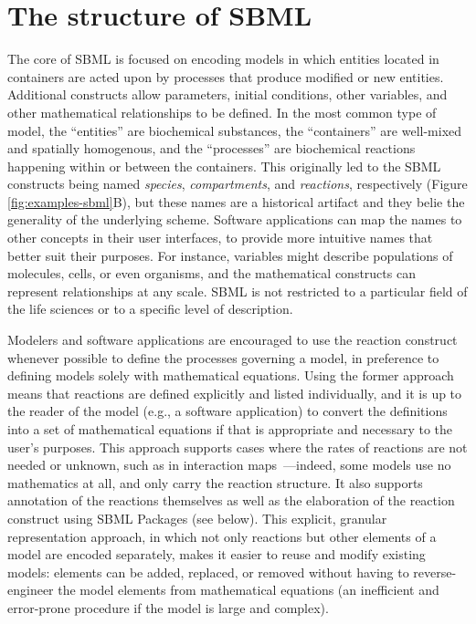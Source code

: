 \documentclass[]{draft-sbml-paper}
\begin{document}
\clearpage
\newpage

\section*{The structure of SBML}
\label{sec:sbml}

The core of SBML is focused on encoding models in which entities located in containers are acted upon by processes that produce modified or new entities.  Additional constructs allow parameters, initial conditions, other variables, and other mathematical relationships to be defined.  In the most common type of model, the ``entities'' are biochemical substances, the ``containers'' are well-mixed and spatially homogenous, and the ``processes'' are biochemical reactions happening within or between the containers.  This originally led to the SBML constructs being named \emph{species}, \emph{compartments}, and \emph{reactions}, respectively (Figure \ref{fig:examples-sbml}B), but these names are a historical artifact and they belie the generality of the underlying scheme.  Software applications can map the names to other concepts in their user interfaces, to provide more intuitive names that better suit their purposes.  For instance, variables might describe populations of molecules, cells, or even organisms, and the mathematical constructs can represent relationships at any scale.  SBML is not restricted to a particular field of the life sciences or to a specific level of description.

Modelers and software applications are encouraged to use the reaction construct whenever possible to define the processes governing a model, in preference to defining models solely with mathematical equations.  Using the former approach means that reactions are defined explicitly and listed individually, and it is up to the reader of the model (e.g., a software application) to convert the definitions into a set of mathematical equations if that is appropriate and necessary to the user's purposes.  This approach supports cases where the rates of reactions are not needed or unknown, such as in interaction maps~\citep[e.g.,][]{oda2005comprehensive}---indeed, some models use no mathematics at all, and only carry the reaction structure.  It also supports annotation of the reactions themselves as well as the elaboration of the reaction construct using SBML Packages (see below).  This explicit, granular representation approach, in which not only reactions but other elements of a model are encoded separately, makes it easier to reuse and modify existing models: elements can be added, replaced, or removed without having to reverse-engineer the model elements from mathematical equations (an inefficient and error-prone procedure if the model is large and complex).
\end{document}
